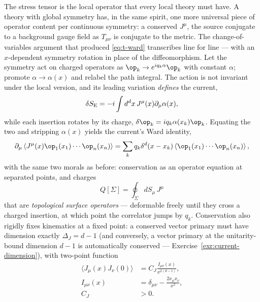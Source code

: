 The stress tensor is the local operator that every local theory must have. A
theory with global symmetry has, in the same spirit, one more universal
piece of operator content per continuous symmetry: a conserved 
$J^\mu$, the source conjugate to a background gauge field as $T_{\mu\nu}$ is
conjugate to the metric. The change-of-variables argument that produced
\eqref{eq:t-ward} transcribes line for line --- with an $x$-dependent
symmetry rotation in place of the diffeomorphism. Let the symmetry act on
charged operators as $\op_k \to e^{iq_k\alpha}\op_k$ with constant
$\alpha$; promote $\alpha \to \alpha(x)$ and relabel the path integral. The
action is not invariant under the local version, and its leading variation
\emph{defines} the current,
\begin{equation}
\delta S_{\rm E} = -i\int d^dx\, J^\mu(x) \partial_\mu \alpha(x),
\end{equation}
while each insertion rotates by its charge, $\delta\op_k = i q_k
\alpha(x_k)\op_k$. Equating the two and stripping $\alpha(x)$ yields the
current's Ward identity,
\begin{equation}
\partial_\mu \left\langle J^{\mu}(x)\op_1(x_1)\cdots\op_n(x_n)\right\rangle
= \sum_{k} q_k \delta^d(x - x_k)
\left\langle \op_1(x_1)\cdots\op_n(x_n)\right\rangle ,
\label{eq:j-ward}
\end{equation}
with the same two morals as before: conservation as an
operator equation at separated points, and charges
\begin{equation}
Q[\Sigma] = \oint_\Sigma dS_\mu\, J^\mu
\label{eq:current-charge}
\end{equation}
that are \emph{topological surface operators} --- deformable freely until
they cross a charged insertion, at which point the correlator jumps by
$q_k$.
Conservation also rigidly fixes kinematics at a fixed point: a conserved
vector primary must have dimension exactly $\Delta_J = d - 1$ (and conversely,
a vector primary at the unitarity-bound dimension $d-1$ is automatically
conserved --- Exercise~\ref{exr:current-dimension}), with two-point function
\begin{equation}
\begin{aligned}
\langle J_\mu(x) J_\nu(0)\rangle
&= C_J \frac{I_{\mu\nu}(x)}{x^{2(d-1)}},\\
I_{\mu\nu}(x) &= \delta_{\mu\nu} - \frac{2 x_\mu x_\nu}{x^2},\\
C_J &> 0.
\end{aligned}
\label{eq:jj-2pt}
\end{equation}


